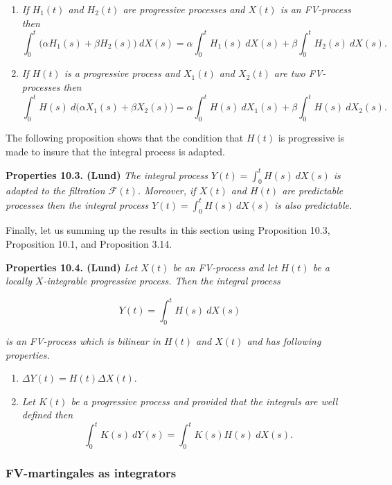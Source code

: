 \documentclass[a4paper,10pt,openany]{book}
\providecommand{\tightlist}{%
 \setlength{\itemsep}{0pt}\setlength{\parskip}{0pt}}
\begin{document}
\begin{enumerate}
\def\labelenumi{(\roman{enumi})}
\tightlist
\item
  \emph{If \(H_1(t)\) and \(H_2(t)\) are progressive processes and \(X(t)\) is an FV-process then}
  \[\int_0^t\Big(\alpha H_1(s) + \beta H_2(s)\Big)\ dX(s)=\alpha\int_0^t H_1(s)\ dX(s)+\beta\int_0^t H_2(s)\ dX(s).\]
\item
  \emph{If \(H(t)\) is a progressive process and \(X_1(t)\) and \(X_2(t)\) are two FV-processes then}
  \[\int_0^tH(s)\ d\Big(\alpha X_1(s) + \beta X_2(s)\Big)=\alpha\int_0^tH(s)\ d X_1(s)+\beta \int_0^tH(s)\ d X_2(s).\]
\end{enumerate}

The following proposition shows that the condition that \(H(t)\) is progressive is made to insure that the integral process is adapted.

\textbf{Properties 10.3. (Lund)} \emph{The integral process \(Y(t)=\int_0^t H(s)\ dX(s)\) is adapted to the filtration \(\mathcal F(t)\). Moreover, if \(X(t)\) and \(H(t)\) are predictable processes then the integral process \(Y(t) = \int_0^t H(s)\ dX(s)\) is also predictable.}

Finally, let us summing up the results in this section using Proposition 10.3, Proposition 10.1, and Proposition 3.14.

\textbf{Properties 10.4. (Lund)} \emph{Let \(X(t)\) be an FV-process and let \(H(t)\) be a locally \(X\)-integrable progressive process. Then the integral process}

\[
Y(t)=\int_0^tH(s)\ dX(s)
\]

\emph{is an FV-process which is bilinear in \(H(t)\) and \(X(t)\) and has following properties.}

\begin{enumerate}
\def\labelenumi{(\roman{enumi})}
\tightlist
\item
  \(\Delta Y(t)=H(t)\Delta X(t)\).
\item
  \emph{Let \(K(t)\) be a progressive process and provided that the integrals are well defined then}
  \[\int_0^t K(s)\ dY(s)=\int_0^tK(s)H(s)\ dX(s).\]
\end{enumerate}

\hypertarget{fv-martingales-as-integrators}{%
\subsubsection{FV-martingales as integrators}\label{fv-martingales-as-integrators}}
\end{document}
